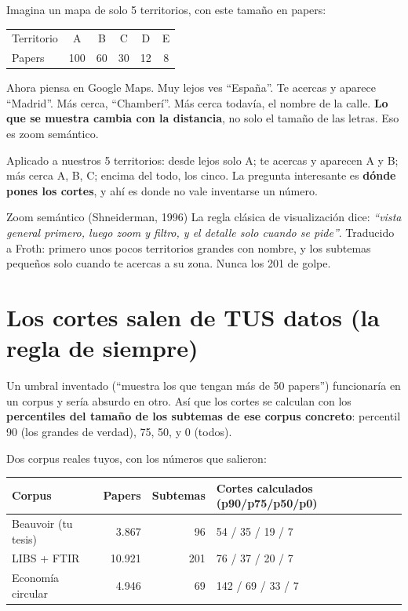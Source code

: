 \documentclass[11pt,a4paper]{article}
\begin{document}
Imagina un mapa de solo 5 territorios, con este tamaño en papers:

\begin{center}
\begin{tabular}{lccccc}
\hline
Territorio & A & B & C & D & E \\
Papers     & 100 & 60 & 30 & 12 & 8 \\
\hline
\end{tabular}
\end{center}

Ahora piensa en Google Maps. Muy lejos ves ``España''. Te acercas y aparece ``Madrid''.
Más cerca, ``Chamberí''. Más cerca todavía, el nombre de la calle. \textbf{Lo que se
muestra cambia con la distancia}, no solo el tamaño de las letras. Eso es zoom semántico.

Aplicado a nuestros 5 territorios: desde lejos solo A; te acercas y aparecen A y B;
más cerca A, B, C; encima del todo, los cinco. La pregunta interesante es
\textbf{dónde pones los cortes}, y ahí es donde no vale inventarse un número.

\begin{concepto}{Zoom semántico (Shneiderman, 1996)}
La regla clásica de visualización dice: \emph{``vista general primero, luego zoom y
filtro, y el detalle solo cuando se pide''}. Traducido a Froth: primero unos pocos
territorios grandes con nombre, y los subtemas pequeños solo cuando te acercas a su zona.
Nunca los 201 de golpe.
\end{concepto}

\section{Los cortes salen de TUS datos (la regla de siempre)}

Un umbral inventado (``muestra los que tengan más de 50 papers'') funcionaría en un
corpus y sería absurdo en otro. Así que los cortes se calculan con los
\textbf{percentiles del tamaño de los subtemas de ese corpus concreto}: percentil 90
(los grandes de verdad), 75, 50, y 0 (todos).

Dos corpus reales tuyos, con los números que salieron:

\begin{center}
\begin{tabular}{lrrl}
\hline
Corpus & Papers & Subtemas & Cortes calculados (p90/p75/p50/p0) \\
\hline
Beauvoir (tu tesis)  & 3.867  & 96  & 54 / 35 / 19 / 7 \\
LIBS + FTIR          & 10.921 & 201 & 76 / 37 / 20 / 7 \\
Economía circular    & 4.946  & 69  & 142 / 69 / 33 / 7 \\
\hline
\end{tabular}
\end{center}
\end{document}
